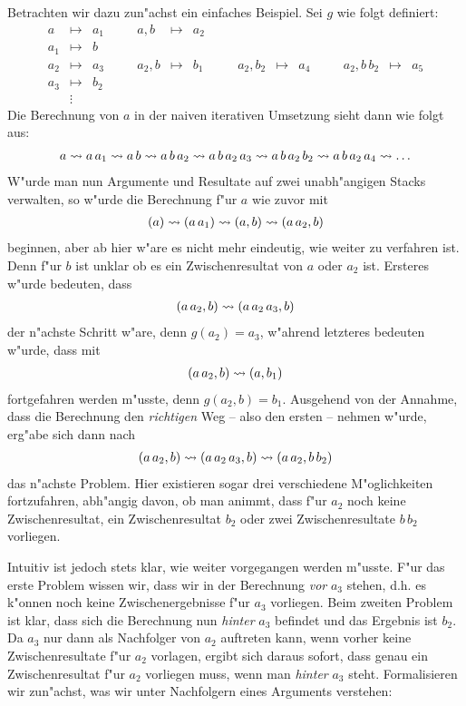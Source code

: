 \documentclass[12pt,a4paper]{article}
\begin{document}
Betrachten wir dazu zun"achst ein einfaches Beispiel. Sei $g$ wie folgt definiert:
\[\begin{array}{lclclclclcllclc}
  a &\mapsto& a_1 &\quad& a,b &\mapsto& a_2 &\quad& && &\quad& \\
  a_1 &\mapsto& b \\
  a_2 &\mapsto& a_3 && a_2,b &\mapsto& b_1 && a_2,b_2 &\mapsto& a_4 && a_2,b\,b_2 &\mapsto& a_5 \\
  a_3 &\mapsto& b_2 \\
  &\vdots&
\end{array}\]
Die Berechnung von $a$ in der naiven iterativen Umsetzung sieht dann wie folgt aus:
\[\begin{array}{c}
a \rightsquigarrow a\,a_1 \rightsquigarrow a\,b \rightsquigarrow a\,b\,a_2 \rightsquigarrow a\,b\,a_2\,a_3 \rightsquigarrow a\,b\,a_2\,b_2 \rightsquigarrow a\,b\,a_2\,a_4 \rightsquigarrow \ldots
\end{array}\]
W"urde man nun Argumente und Resultate auf zwei unabh"angigen Stacks verwalten, so w"urde die
Berechnung f"ur $a$ wie zuvor mit
\[\begin{array}{c}
(a) \rightsquigarrow (a\,a_1) \rightsquigarrow (a,b) \rightsquigarrow (a\,a_2,b)
\end{array}\]
beginnen, aber ab hier w"are es nicht mehr eindeutig, wie weiter zu verfahren ist. Denn f"ur $b$ ist
unklar ob es ein Zwischenresultat von $a$ oder $a_2$ ist. Ersteres w"urde bedeuten, dass
\[\begin{array}{c}
(a\,a_2,b) \rightsquigarrow (a\,a_2\,a_3,b)
\end{array}\]
der n"achste Schritt w"are, denn $g(a_2)=a_3$, w"ahrend letzteres bedeuten w"urde, dass mit
\[\begin{array}{c}
(a\,a_2,b) \rightsquigarrow (a,b_1)
\end{array}\]
fortgefahren werden m"usste, denn $g(a_2,b)=b_1$. Ausgehend von der Annahme, dass die Berechnung den \emph{richtigen}
Weg -- also den ersten -- nehmen w"urde, erg"abe sich dann nach
\[\begin{array}{c}
(a\,a_2,b) \rightsquigarrow (a\,a_2\,a_3,b) \rightsquigarrow (a\,a_2,b\,b_2)
\end{array}\]
das n"achste Problem. Hier existieren sogar drei verschiedene M"oglichkeiten fortzufahren, abh"angig
davon, ob man animmt, dass f"ur $a_2$ noch keine Zwischenresultat, ein Zwischenresultat $b_2$ oder zwei
Zwischenresultate $b\,b_2$ vorliegen.

Intuitiv ist jedoch stets klar, wie weiter vorgegangen werden m"usste. F"ur das erste Problem wissen wir,
dass wir in der Berechnung \emph{vor} $a_3$ stehen, d.h. es k"onnen noch keine Zwischenergebnisse f"ur $a_3$
vorliegen. Beim zweiten Problem ist klar, dass sich die Berechnung nun \emph{hinter} $a_3$ befindet und das
Ergebnis ist $b_2$. Da $a_3$ nur dann als Nachfolger von $a_2$ auftreten kann, wenn vorher keine
Zwischenresultate f"ur $a_2$ vorlagen, ergibt sich daraus sofort, dass genau ein Zwischenresultat f"ur $a_2$
vorliegen muss, wenn man \emph{hinter} $a_3$ steht. Formalisieren wir zun"achst, was wir unter Nachfolgern
eines Arguments verstehen:
\end{document}
